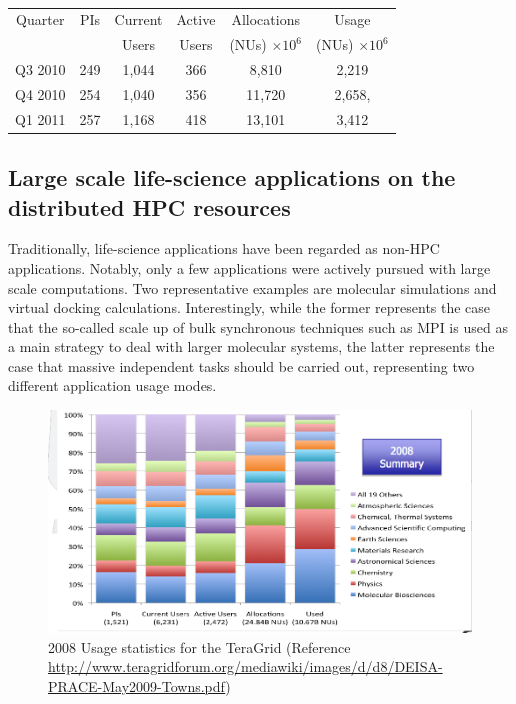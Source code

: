 \documentclass{sig-alternate}
\begin{document}
\begin{table}
 \small
\begin{tabular}{|c|c|c|c|c|c|} 
  \hline  Quarter & PIs & Current & Active & Allocations  & Usage\\
  & & Users  &  Users & (NUs) $\times 10^6$& (NUs) $\times 10^6$ \\ \hline
  Q3 2010 & 249 & 1,044 & 366 & 8,810   & 2,219  \\ \hline
  Q4 2010 & 254 & 1,040 & 356 & 11,720  & 2,658, \\ \hline
  Q1 2011 & 257 & 1,168 & 418 & 13,101  & 3,412\\ \hline 
\end{tabular} 
\caption{}
 \label{} 
\end{table}



\subsection{Large scale life-science applications on the distributed HPC resources}
Traditionally, life-science applications have been regarded as non-HPC
applications.  Notably, only a few applications were actively pursued with
large scale computations.  Two representative examples are molecular
simulations and virtual docking calculations.  Interestingly, while
the former represents the case that the so-called scale up of bulk
synchronous techniques such as MPI is used as a main strategy to deal with
larger molecular systems, the latter represents the case that massive
independent tasks should be carried out, representing two different
application usage modes.

\begin{figure}
 \centering
\includegraphics[scale=0.27]{figures/teragrid-discipline08}
\caption{\small 2008 Usage statistics for the TeraGrid (Reference
  \url{http://www.teragridforum.org/mediawiki/images/d/d8/DEISA-PRACE-May2009-Towns.pdf})}
  \label{tg2008}
\end{figure}
\end{document}
